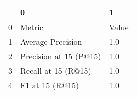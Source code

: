\begin{tabular}{lll}
\toprule
{} &                       0 &      1 \\
\midrule
0 &                  Metric &  Value \\
1 &       Average Precision &    1.0 \\
2 &  Precision at 15 (P@15) &    1.0 \\
3 &     Recall at 15 (R@15) &    1.0 \\
4 &         F1 at 15 (R@15) &    1.0 \\
\bottomrule
\end{tabular}
